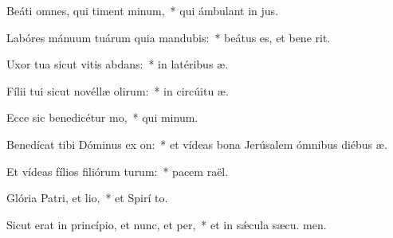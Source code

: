 \item Beáti omnes, qui timent minum,~* qui ámbulant in  jus.
\item Labóres mánuum tuárum quia mandubis:~* beátus es, et bene  rit.
\item Uxor tua sicut vitis abdans:~* in latéribus  æ.
\item Fílii tui sicut novéllæ olirum:~* in circúitu  æ.
\item Ecce sic benedicétur mo,~* qui  minum.
\item Benedícat tibi Dóminus ex on:~* et vídeas bona Jerúsalem ómnibus diébus  æ.
\item Et vídeas fílios filiórum turum:~* pacem  raël.
\item Glória Patri, et lio,~* et Spirí to.
\item Sicut erat in princípio, et nunc, et per,~* et in sǽcula sæcu. men.
